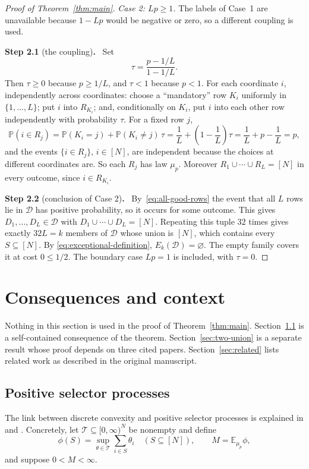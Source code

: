 \documentclass[11pt,letterpaper]{article}
\theoremstyle{definition}
\theoremstyle{remark}
\numberwithin{equation}{section}
\newcommand{\step}[2]{\medskip\noindent\textbf{Step #1} (#2)\textbf{.}\ }
\begin{document}
\begin{proof}[Proof of Theorem~\ref{thm:main}]
\medskip
\noindent\emph{Case 2: $Lp\ge1$.} The labels of Case~1 are unavailable
because $1-Lp$ would be negative or zero, so a different coupling is used.

\step{2.1}{the coupling}
Set
\[
\tau=\frac{p-1/L}{1-1/L}.
\]
Then $\tau\ge0$ because $p\ge1/L$, and $\tau<1$ because $p<1$. For each
coordinate $i$, independently across coordinates: choose a ``mandatory''
row $K_i$ uniformly in $\{1,\ldots,L\}$; put $i$ into $R_{K_i}$; and,
conditionally on $K_i$, put $i$ into each other row independently with
probability $\tau$. For a fixed row $j$,
\[
\mathbb P(i\in R_j)
=\mathbb P(K_i=j)+\mathbb P(K_i\ne j)\,\tau
=\frac1L+\left(1-\frac1L\right)\tau=\frac1L+p-\frac1L=p,
\]
and the events $\{i\in R_j\}$, $i\in[N]$, are independent because the
choices at different coordinates are. So each $R_j$ has law $\mu_p$.
Moreover $R_1\cup\cdots\cup R_L=[N]$ in every outcome, since
$i\in R_{K_i}$.

\step{2.2}{conclusion of Case 2}
By~\eqref{eq:all-good-rows} the event that all $L$ rows lie in
$\mathcal D$ has positive probability, so it occurs for some outcome. This
gives $D_1,\ldots,D_L\in\mathcal D$ with $D_1\cup\cdots\cup D_L=[N]$.
Repeating this tuple $32$ times gives exactly $32L=k$ members of
$\mathcal D$ whose union is $[N]$, which contains every $S\subseteq[N]$.
By \eqref{eq:exceptional-definition}, $E_k(\mathcal D)=\varnothing$. The
empty family covers it at cost $0\le1/2$. The boundary case $Lp=1$ is
included, with $\tau=0$.
\end{proof}

\section{Consequences and context}
\label{sec:context}

Nothing in this section is used in the proof of Theorem~\ref{thm:main}.
Section~\ref{sec:selectors} is a self-contained consequence of the
theorem. Section~\ref{sec:two-union} is a separate result whose proof
depends on three cited papers. Section~\ref{sec:related} lists related
work as described in the original manuscript.

\subsection{Positive selector processes}
\label{sec:selectors}

The link between discrete convexity and positive selector processes is
explained in \cite[Section~7]{Talagrand10} and
\cite[Proposition~13.3.3]{Talagrand21}. Concretely, let
$\mathcal T\subseteq[0,\infty)^N$ be nonempty and define
\[
\phi(S)=\sup_{\theta\in\mathcal T}\sum_{i\in S}\theta_i\quad(S\subseteq[N]),
\qquad M=\mathbb E_{\mu_p}\phi,
\]
and suppose $0<M<\infty$.
\end{document}
